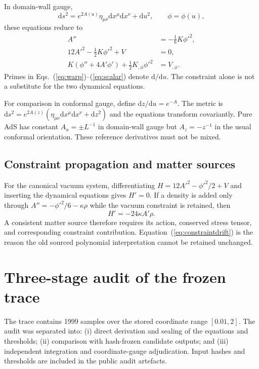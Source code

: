 \documentclass[10pt]{article}
\newcommand{\dd}{\mathrm{d}}
\begin{document}
In domain-wall gauge,
\begin{equation}
 \dd s^2=e^{2A(u)}\eta_{\mu\nu}\dd x^\mu\dd x^\nu+\dd u^2,
 \qquad \phi=\phi(u),
 \label{eq:domainwall}
\end{equation}
these equations reduce to
\begin{align}
 A''&=-\frac16K\phi'^2,\label{eq:warp}\\
 12A'^2-\frac12K\phi'^2+V&=0,\label{eq:constraint}\\
 K(\phi''+4A'\phi')+\frac12K_{,\phi}\phi'^2&=V_{,\phi}.
 \label{eq:scalar}
\end{align}
Primes in Eqs.~(\ref{eq:warp})--(\ref{eq:scalar}) denote $\dd/\dd u$.
The constraint alone is not a substitute for the two dynamical equations.

For comparison in conformal gauge, define $\dd z/\dd u=e^{-A}$.  The metric is
$\dd s^2=e^{2A(z)}(\eta_{\mu\nu}\dd x^\mu\dd x^\nu+\dd z^2)$ and the equations
transform covariantly.  Pure AdS has constant $A_u=\pm L^{-1}$ in domain-wall
gauge but $A_z=-z^{-1}$ in the usual conformal orientation.  These reference
derivatives must not be mixed.

\subsection{Constraint propagation and matter sources}

For the canonical vacuum system, differentiating
$H=12A'^2-\phi'^2/2+V$ and inserting the dynamical equations gives $H'=0$.
If a density is added only through
$A''=-\phi'^2/6-\kappa\rho$ while the vacuum constraint is retained, then
\begin{equation}
 H'=-24\kappa A'\rho.
 \label{eq:constraintdrift}
\end{equation}
A consistent matter source therefore requires its action, conserved stress
tensor, and corresponding constraint contribution.  Equation~(\ref{eq:constraintdrift})
is the reason the old sourced polynomial interpretation cannot be retained
unchanged.

\section{Three-stage audit of the frozen trace}
\label{sec:audit}

The trace contains 1999 samples over the stored coordinate range
$[0.01,2]$.  The audit was separated into: (i) direct derivation and sealing of
the equations and thresholds; (ii) comparison with hash-frozen candidate
outputs; and (iii) independent integration and coordinate-gauge adjudication.
Input hashes and thresholds are included in the public audit artefacts.
\end{document}
